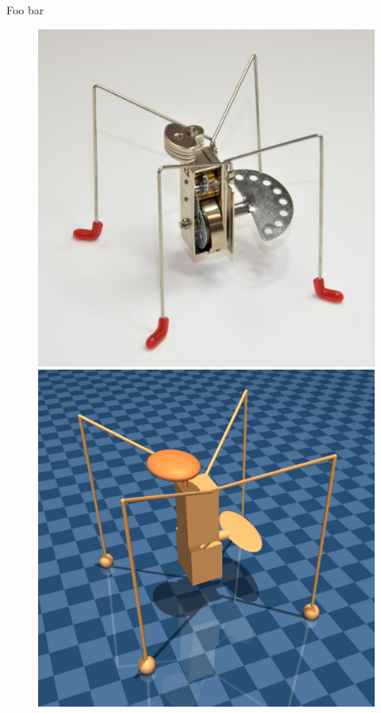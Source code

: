 \documentclass[letterpaper, 10 pt, conference]{ieeeconf}
\begin{document}

Foo bar \cite{Haarnoja2018SAC}






\lipsum[1-2]

\begin{figure}[ht]
    
    \centering
    
    \begin{minipage}[b]{0.49\linewidth}
        \centering
        \includegraphics[width=\linewidth]{katita}
    \end{minipage}
    \begin{minipage}[b]{0.49\linewidth}
        \centering
        \includegraphics[width=\linewidth]{jitterbug}
    \end{minipage}
    

\end{figure}
\end{document}
